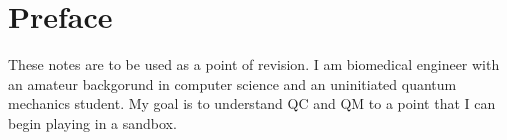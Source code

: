 \section*{Preface}
These notes are to be used as a point of revision. I am biomedical engineer with an amateur backgorund in computer science and an uninitiated quantum mechanics student. My goal is to understand QC and QM to a point that I can begin playing in a sandbox.